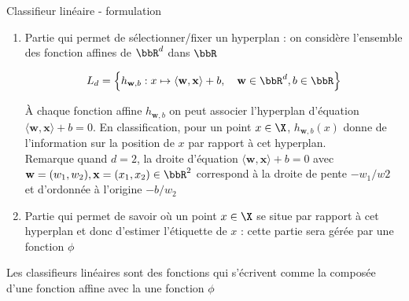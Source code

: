 \documentclass[10pt]{beamer}
\newcommand{\hsp}{\hspace*{1em}}
\begin{document}
\begin{frame}{Classifieur linéaire - formulation}
	\begin{enumerate}
	\item Partie qui permet de sélectionner/fixer un hyperplan : on considère l'ensemble des fonction affines de $\bbR^d$ dans $\bbR$
	
	$$ L_d = \left\{h_{\mathbf{w},b} : x \mapsto \langle \mathbf{w}, \mathbf{x}\rangle + b, \hsp \mathbf{w} \in \bbR^d, b \in \bbR\right\}$$
	
	À chaque fonction affine $h_{\mathbf{w},b}$ on peut associer l'hyperplan d'équation $\langle \mathbf{w}, \mathbf{x}\rangle + b = 0$. En classification, pour un point $x\in \X$, $h_{\mathbf{w},b}(x)$ donne de l'information sur la position de $x$ par rapport à cet hyperplan. \\[0.5em]
	
	\textcolor{MPTblue}{Remarque} \hsp quand $d=2$, la droite d'équation $\langle \mathbf{w}, \mathbf{x}\rangle + b = 0$ avec $\mathbf{w}=(w_1,w_2), \mathbf{x}=(x_1,x_2) \in \bbR^2$ correspond à la droite de pente $ -w_1/w2 $ et d'ordonnée à l'origine $-b/w_2$ \\[2em]
	

	\item Partie qui permet de savoir où un point $x \in \X$ se situe par rapport à cet hyperplan et donc d'estimer l'étiquette de $x$ : cette partie sera gérée par une fonction $\phi$\\[1em]
	
	
	\end{enumerate}
	
	
	Les classifieurs linéaires sont des fonctions qui s'écrivent comme la composée d'une fonction affine avec la une fonction $\phi$
	
	
\end{frame}
\end{document}
